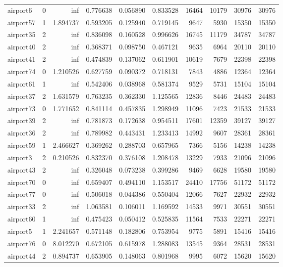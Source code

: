 \begin{longtable}{|l|r|r|r|r|r|r|r|r|r|}
airport6 & 0 & inf & 0.776638 & 0.056890 & 0.833528 & 16464 & 10179 & 30976 & 30976 \\
airport57 & 1 & 1.894737 & 0.593205 & 0.125940 & 0.719145 & 9647 & 5930 & 15350 & 15350 \\
airport35 & 2 & inf & 0.836098 & 0.160528 & 0.996626 & 16745 & 11179 & 34787 & 34787 \\
airport40 & 2 & inf & 0.368371 & 0.098750 & 0.467121 & 9635 & 6964 & 20110 & 20110 \\
airport41 & 2 & inf & 0.474839 & 0.137062 & 0.611901 & 10619 & 7679 & 22398 & 22398 \\
airport74 & 0 & 1.210526 & 0.627759 & 0.090372 & 0.718131 & 7843 & 4886 & 12364 & 12364 \\
airport61 & 1 & inf & 0.542406 & 0.038968 & 0.581374 & 9529 & 5731 & 15104 & 15104 \\
airport37 & 2 & 1.631579 & 0.763235 & 0.362330 & 1.125565 & 12836 & 8446 & 24483 & 24483 \\
airport73 & 0 & 1.771652 & 0.841114 & 0.457835 & 1.298949 & 11096 & 7423 & 21533 & 21533 \\
airport39 & 2 & inf & 0.781873 & 0.172638 & 0.954511 & 17601 & 12359 & 39127 & 39127 \\
airport36 & 2 & inf & 0.789982 & 0.443431 & 1.233413 & 14992 & 9607 & 28361 & 28361 \\
airport59 & 1 & 2.466627 & 0.369262 & 0.288703 & 0.657965 & 7366 & 5156 & 14238 & 14238 \\
airport3 & 2 & 0.210526 & 0.832370 & 0.376108 & 1.208478 & 13229 & 7933 & 21096 & 21096 \\
airport43 & 2 & inf & 0.326048 & 0.073238 & 0.399286 & 9469 & 6628 & 19580 & 19580 \\
airport70 & 0 & inf & 0.659407 & 0.494110 & 1.153517 & 24410 & 17756 & 51172 & 51172 \\
airport77 & 0 & inf & 0.506018 & 0.044386 & 0.550404 & 12066 & 7627 & 22932 & 22932 \\
airport33 & 2 & inf & 1.063581 & 0.106011 & 1.169592 & 14533 & 9971 & 30551 & 30551 \\
airport60 & 1 & inf & 0.475423 & 0.050412 & 0.525835 & 11564 & 7533 & 22271 & 22271 \\
airport5 & 1 & 2.241657 & 0.571148 & 0.182806 & 0.753954 & 9775 & 5891 & 15416 & 15416 \\
airport76 & 0 & 8.012270 & 0.672105 & 0.615978 & 1.288083 & 13545 & 9364 & 28531 & 28531 \\
airport44 & 2 & 0.894737 & 0.653905 & 0.148063 & 0.801968 & 9995 & 6072 & 15620 & 15620 \\

\end{longtable}
